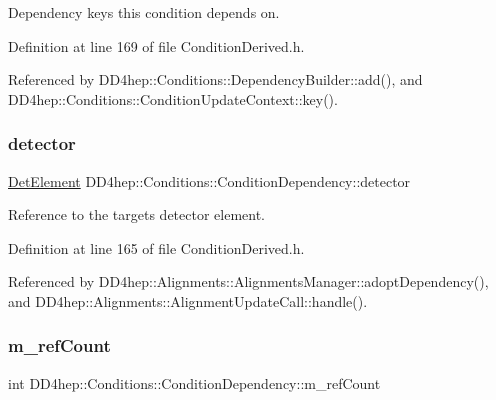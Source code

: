 Dependency keys this condition depends on. 



Definition at line 169 of file Condition\+Derived.\+h.



Referenced by D\+D4hep\+::\+Conditions\+::\+Dependency\+Builder\+::add(), and D\+D4hep\+::\+Conditions\+::\+Condition\+Update\+Context\+::key().

\hypertarget{class_d_d4hep_1_1_conditions_1_1_condition_dependency_a967bc771b0504b80f8ecfa879e03e498}{}\label{class_d_d4hep_1_1_conditions_1_1_condition_dependency_a967bc771b0504b80f8ecfa879e03e498} 
\subsubsection{\texorpdfstring{detector}{detector}}
{\footnotesize\ttfamily \hyperlink{class_d_d4hep_1_1_conditions_1_1_condition_dependency_a0a9ea458cf85d1d76dec51d85830f738}{Det\+Element} D\+D4hep\+::\+Conditions\+::\+Condition\+Dependency\+::detector}



Reference to the target\textquotesingle{}s detector element. 



Definition at line 165 of file Condition\+Derived.\+h.



Referenced by D\+D4hep\+::\+Alignments\+::\+Alignments\+Manager\+::adopt\+Dependency(), and D\+D4hep\+::\+Alignments\+::\+Alignment\+Update\+Call\+::handle().

\hypertarget{class_d_d4hep_1_1_conditions_1_1_condition_dependency_a0962b46c90825f3ee632af2a25520639}{}\label{class_d_d4hep_1_1_conditions_1_1_condition_dependency_a0962b46c90825f3ee632af2a25520639} 
\subsubsection{\texorpdfstring{m\+\_\+ref\+Count}{m\_refCount}}
{\footnotesize\ttfamily int D\+D4hep\+::\+Conditions\+::\+Condition\+Dependency\+::m\+\_\+ref\+Count\hspace{0.3cm}{\ttfamily [protected]}}



